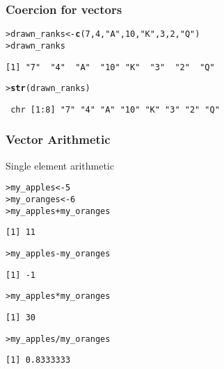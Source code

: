 \documentclass[13pt,aspectratio=169]{beamer}\usepackage[]{graphicx}\usepackage[]{color}
\makeatletter
\newcommand{\hlnum}[1]{\textcolor[rgb]{0.686,0.059,0.569}{#1}}%
\newcommand{\hlstr}[1]{\textcolor[rgb]{0.192,0.494,0.8}{#1}}%
\newcommand{\hlopt}[1]{\textcolor[rgb]{0,0,0}{#1}}%
\newcommand{\hlstd}[1]{\textcolor[rgb]{0.345,0.345,0.345}{#1}}%
\newcommand{\hlkwb}[1]{\textcolor[rgb]{0.69,0.353,0.396}{#1}}%
\newcommand{\hlkwd}[1]{\textcolor[rgb]{0.737,0.353,0.396}{\textbf{#1}}}%
\newenvironment{kframe}{%
 \def\at@end@of@kframe{}%
 \ifinner\ifhmode%
  \def\at@end@of@kframe{\end{minipage}}%
  \begin{minipage}{\columnwidth}%
 \fi\fi%
 \def\FrameCommand##1{\hskip\@totalleftmargin \hskip-\fboxsep
 \colorbox{shadecolor}{##1}\hskip-\fboxsep
     \hskip-\linewidth \hskip-\@totalleftmargin \hskip\columnwidth}%
 \MakeFramed {\advance\hsize-\width
   \@totalleftmargin\z@ \linewidth\hsize
   \@setminipage}}%
 {\par\unskip\endMakeFramed%
 \at@end@of@kframe}
\newenvironment{knitrout}{}{} %
\renewenvironment{knitrout}{\setlength{\topsep}{0mm}}{}
\makeatother
\begin{document}
\begin{frame}[fragile]
    \frametitle{Coercion for vectors}
\begin{knitrout}\small
{}\color{fgcolor}\begin{kframe}
\begin{alltt}
\hlstd{> }\hlstd{drawn_ranks} \hlkwb{<-} \hlkwd{c}\hlstd{(}\hlnum{7}\hlstd{,} \hlnum{4}\hlstd{,} \hlstr{"A"}\hlstd{,} \hlnum{10}\hlstd{,} \hlstr{"K"}\hlstd{,} \hlnum{3}\hlstd{,} \hlnum{2}\hlstd{,} \hlstr{"Q"}\hlstd{)}
\hlstd{> }\hlstd{drawn_ranks}
\end{alltt}
\begin{verbatim}
[1] "7"  "4"  "A"  "10" "K"  "3"  "2"  "Q" 
\end{verbatim}
\begin{alltt}
\hlstd{> }\hlkwd{str}\hlstd{(drawn_ranks)}
\end{alltt}
\begin{verbatim}
 chr [1:8] "7" "4" "A" "10" "K" "3" "2" "Q"
\end{verbatim}
\end{kframe}
\end{knitrout}

\end{frame}

\begin{frame}[fragile]
    \frametitle{Vector Arithmetic}
\vskip10pt
Single element arithmetic
\vskip10pt
\begin{knitrout}\small
{}\color{fgcolor}\begin{kframe}
\begin{alltt}
\hlstd{> }\hlstd{my_apples} \hlkwb{<-} \hlnum{5}
\hlstd{> }\hlstd{my_oranges} \hlkwb{<-} \hlnum{6}
\hlstd{> }\hlstd{my_apples} \hlopt{+} \hlstd{my_oranges}
\end{alltt}
\begin{verbatim}
[1] 11
\end{verbatim}
\begin{alltt}
\hlstd{> }\hlstd{my_apples} \hlopt{-} \hlstd{my_oranges}
\end{alltt}
\begin{verbatim}
[1] -1
\end{verbatim}
\begin{alltt}
\hlstd{> }\hlstd{my_apples} \hlopt{*} \hlstd{my_oranges}
\end{alltt}
\begin{verbatim}
[1] 30
\end{verbatim}
\begin{alltt}
\hlstd{> }\hlstd{my_apples} \hlopt{/} \hlstd{my_oranges}
\end{alltt}
\begin{verbatim}
[1] 0.8333333
\end{verbatim}
\end{kframe}
\end{knitrout}
\end{frame}
\end{document}
